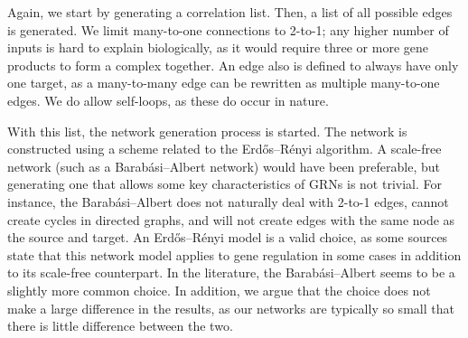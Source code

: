 \documentclass[../main.tex]{subfiles}
\begin{document}
Again, we start by generating a correlation list.
Then, a list of all possible edges is generated.
We limit many-to-one connections to 2-to-1; any higher number of inputs is hard to explain biologically, as it would require three or more gene products to form a complex together.
An edge also is defined to always have only one target, as a many-to-many edge can be rewritten as multiple many-to-one edges.
We do allow self-loops, as these do occur in nature.

With this list, the network generation process is started.
The network is constructed using a scheme related to the Erdős–Rényi algorithm.
A scale-free network (such as a Barabási–Albert network) would have been preferable, but generating one that allows some key characteristics of GRNs is not trivial.
For instance, the Barabási–Albert does not naturally deal with 2-to-1 edges, cannot create cycles in directed graphs, and will not create edges with the same node as the source and target.
An Erdős–Rényi model is a valid choice, as some sources state that this network model applies to gene regulation in some cases in addition to its scale-free counterpart.
In the literature, the Barabási–Albert seems to be a slightly more common choice.
In addition, we argue that the choice does not make a large difference in the results, as our networks are typically so small that there is little difference between the two.
\end{document}
